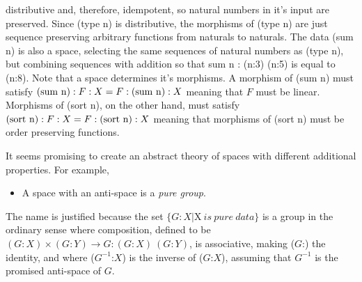 \documentclass[11pt]{article}
\begin{document}
distributive and, therefore, idempotent, so natural numbers in it's input are preserved.
Since (type n) is distributive, the morphisms of (type n) are just sequence preserving arbitrary functions from naturals to naturals.
The data (sum n) is also a space, selecting the same sequences of  natural numbers as (type n), but combining
sequences with addition so that sum n : (n:3) (n:5) is equal to (n:8).  Note that a space determines it's morphisms.
A morphism of (sum n) must satisfy $({\rm sum\ n}):F:X = F:({\rm sum\ n}):X$ meaning that $F$ must be linear.
Morphisms of (sort n), on the other hand, must satisfy $({\rm sort\ n}):F:X=F:({\rm sort\ n}):X$ meaning that
morphisms of (sort n) must be order preserving functions.

     It seems promising to create an abstract theory of spaces with different additional properties.  For
 example,
\begin{itemize}
\item A space with an anti-space is a {\it pure group}.
\end{itemize}
The name is justified because the set $\{G:X | $X$\ is\ pure\ data\}$
is a group in the ordinary sense where composition, defined to be $(G:X)\times(G:Y)\rightarrow G:(G:X)\ (G:Y)$, is associative, making 
($G$:) the identity, and where ($G^{-1}$:$X$) is the inverse of ($G$:$X$), assuming that $G^{-1}$ is the promised anti-space of $G$.
\end{document}

